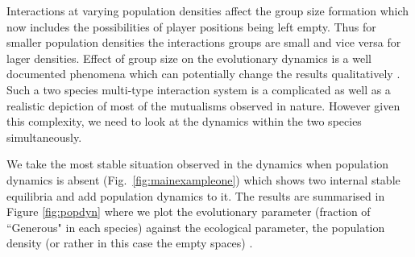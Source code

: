 \documentclass[12pt]{article}
\begin{document}
Interactions at varying population densities affect the group size formation which now includes the possibilities of player positions being left empty.
Thus for smaller population densities the interactions groups are small and vice versa for lager densities.
Effect of group size on the evolutionary dynamics is a well documented phenomena which can potentially change the results qualitatively \citep{pacheco:PRSB:2009,souza:JTB:2009}.
Such a two species multi-type interaction system is a complicated as well as a realistic depiction of most of the mutualisms observed in nature.
However given this complexity, we need to look at the dynamics within the two species simultaneously.

We take the most stable situation observed in the dynamics when population dynamics is absent (Fig.~\ref{fig:mainexampleone}) which shows two internal stable equilibria and add population dynamics to it.
The results are summarised in Figure \ref{fig:popdyn} where we plot the evolutionary parameter (fraction of ``Generous" in each species) against the ecological parameter, the population density (or rather in this case the empty spaces) .
\end{document}
